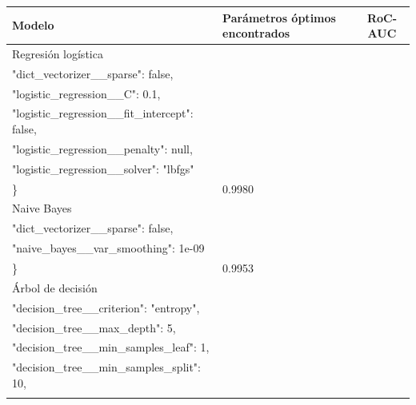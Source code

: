 \documentclass[11pt,a4paper,spanish]{book}
\numberwithin{equation}{chapter}
\numberwithin{figure}{chapter}
\begin{document}
\begin{table}[h]
\centering
\renewcommand{\arraystretch}{1.3}
\begin{tabular}{|p{3.5cm}|p{9cm}|c|}
    \hline
    \textbf{Modelo} & \textbf{Parámetros óptimos encontrados} & \textbf{RoC-AUC} \\
    \hline
    Regresión logística & 
    \ttfamily
    \begin{minipage}[t]{9cm}
    {\{\\
    \hspace*{0.5cm}"dict\_vectorizer\_\_sparse": false,\\
    \hspace*{0.5cm}"logistic\_regression\_\_C": 0.1,\\
    \hspace*{0.5cm}"logistic\_regression\_\_fit\_intercept": false,\\
    \hspace*{0.5cm}"logistic\_regression\_\_penalty": null,\\
    \hspace*{0.5cm}"logistic\_regression\_\_solver": "lbfgs"\\
    \}}
    \end{minipage}
    & 0.9980 \\
    \hline
    Naive Bayes &
    \ttfamily
    \begin{minipage}[t]{9cm}
    {\{\\
    \hspace*{0.5cm}"dict\_vectorizer\_\_sparse": false,\\
    \hspace*{0.5cm}"naive\_bayes\_\_var\_smoothing": 1e-09\\
    \}}
    \end{minipage}
    & 0.9953 \\
    \hline
    Árbol de decisión &
    \ttfamily
    \begin{minipage}[t]{9cm}
    {\{\\
    \hspace*{0.5cm}"decision\_tree\_\_criterion": "entropy",\\
    \hspace*{0.5cm}"decision\_tree\_\_max\_depth": 5,\\
    \hspace*{0.5cm}"decision\_tree\_\_min\_samples\_leaf": 1,\\
    \hspace*{0.5cm}"decision\_tree\_\_min\_samples\_split": 10,\\
}
\end{minipage}
\end{tabular}
\end{table}
\end{document}
